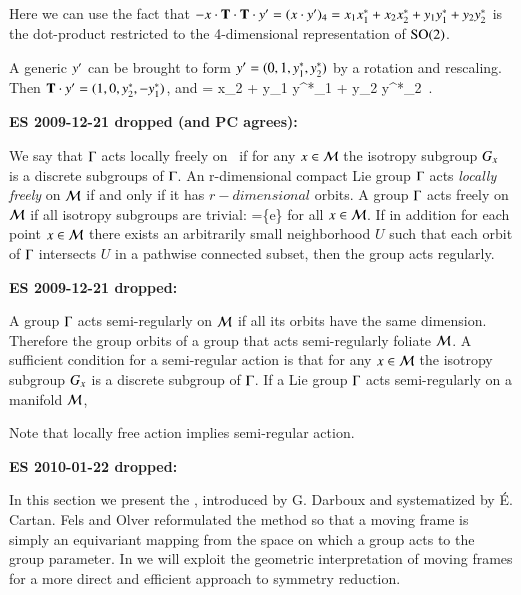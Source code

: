 Here we can use the fact that
$- x \cdot \mathbf{T}\cdot\mathbf{T} \cdot {\ensuremath{y'}}
 = (x \cdot {\ensuremath{y'}} )_4 =
    x_1 x_1^{*}
   +x_2 x_2^{*}
   +y_1 y_1^{*}
   +y_2 y_2^{*}
$
is the dot-product restricted to the 4-dimensional
representation of $\textrm{SO}(2)$.

A generic  $ {y'} $ can be brought to form $ {y'}  =
(0,1,y_1^{*},y_2^{*})$ by a rotation and rescaling. Then $\mathbf{T}
\cdot {\ensuremath{y'}}   = (1,0,y_2^{*},-y_1^{*})$, and
\beq
{} =
     {x_2 + y_1 y^{*}_1 + y_2 y^{*}_2}
\,.
\label{PCsectSin}
\eeq


 {\bf ES 2009-12-21 dropped (and PC agrees):}

We say that $\Gamma$ acts locally freely on \pS\ if for any
$x\in{\cal M}$ the isotropy subgroup $G_{x}$ is a
discrete subgroups of $\Gamma$. An r-dimensional compact Lie
group $\Gamma$ acts \emph{locally freely} on ${\cal M}$ if and
only if it has $r-dimensional$ orbits. A
group $\Gamma$ acts freely on ${\cal M}$ if all isotropy subgroups
are trivial: \stab{\ssp}=\{e\} for all $x\in \mathcal{M}$. If
in addition for each point $x\in \mathcal{M}$ there exists an
arbitrarily small neighborhood $U$ such that each orbit of
$\Gamma$ intersects $U$ in a pathwise connected subset, then
the group acts regularly.

{\bf ES 2009-12-21 dropped:}

A group $\Gamma$ acts semi-regularly on ${\cal M}$ if all its
orbits have the same dimension. Therefore the group orbits of
a group that acts semi-regularly foliate ${\cal M}$. A sufficient
condition for a semi-regular action is that for any
$x\in{\cal M}$ the isotropy subgroup $G_{x}$ is a
discrete subgroup of $\Gamma$. If a Lie group $\Gamma$ acts
semi-regularly on a manifold $\mathcal{M}$,

Note that locally free action implies semi-regular action.

{\bf ES 2010-01-22 dropped:}

In this section we present the {\mframes}, introduced by G. Darboux and
systematized by \'E. Cartan.
Fels and Olver reformulated the method so that a
moving frame is simply an equivariant mapping from the space on which a
group acts to the group parameter.  In  we will
exploit the geometric interpretation of moving frames for a more direct and
efficient approach to symmetry reduction. 

